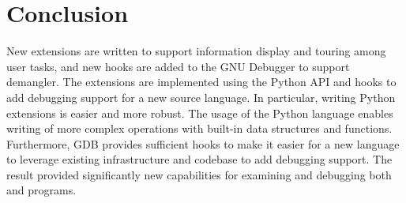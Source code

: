 \chapter{Conclusion}
New extensions are written to support information display and touring among \uCCS user tasks, and
new hooks are added to the GNU
Debugger to support \CFAS demangler. The extensions are implemented using the Python API and hooks to add debugging support for a
new source language. In particular, writing Python extensions is easier and more
robust. The usage of the Python language enables writing of
more complex operations with built-in data structures and functions.
Furthermore, GDB provides sufficient hooks to make it easier for a new language to leverage existing
infrastructure and codebase to add debugging support. The result provided
significantly new capabilities for examining and debugging both \uCPPS and \CFAS
programs.
